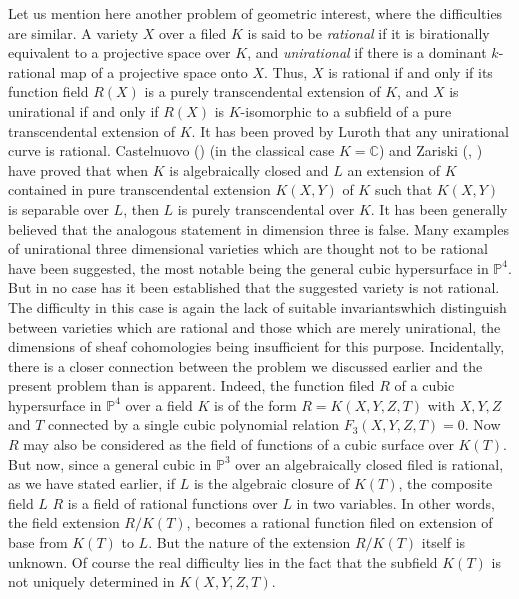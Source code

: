 Let us mention here another problem of geometric interest, where the
difficulties are similar. A variety $X$ over a filed $K$ is said to be
\textit{rational} if it is birationally equivalent to a projective space
over $K$, and \textit{unirational} if there is a dominant $k$-rational
map of a projective space onto $X$. Thus, $X$ is rational if and only
if its function field $R(X)$ is a purely transcendental extension of
$K$, and $X$ is unirational if and only if $R(X)$ is $K$-isomorphic to
a subfield of a pure transcendental extension of $K$. It has been
proved by Luroth that any unirational curve is rational. Castelnuovo
(\cite{key3}) (in the classical case $K = \mathbb{C}$) and Zariski
(\cite{key24}, \cite{key25}) have proved that when $K$ is algebraically closed and
$L$ an extension of $K$ contained in pure transcendental extension
$K(X,Y)$ of $K$ such that $K(X,Y)$ is separable over $L$, then $L$ is
purely transcendental over $K$. It has been generally believed that the
analogous statement  in dimension three is false. Many examples of
unirational three dimensional varieties which are thought not to be
rational have been suggested, the most notable being the general cubic
hypersurface in $\mathbb{P}^4$. But in no case has it been established
that the suggested variety is not rational. The difficulty in this
case is again the lack of suitable invariants\pageoriginale which distinguish
between varieties which are rational and those which are merely
unirational, the dimensions of sheaf cohomologies being insufficient
for this purpose. Incidentally, there is a closer connection between
the problem we discussed earlier and the present problem than is
apparent. Indeed, the function filed $R$ of a cubic hypersurface in
$\mathbb{P}^4$ over a field $K$ is of the form $R =K(X,Y,Z,T)$ with
$X,Y,Z$ and $T$ connected by a single cubic polynomial relation $F_3
(X,Y,Z,T)=0$. Now $R$ may also be considered as the field of
functions of a cubic surface over $K(T)$. But now, since a general
cubic in $\mathbb{P}^3$ over an algebraically closed filed is
rational, as we have stated earlier, if $L$ is the algebraic closure of
$K(T)$, the composite field $L$ $R$ is a field of rational functions
over $L$ in two variables. In other words, the field extension
$R/K(T)$, becomes a rational function filed on extension of base from
$K(T)$ to $L$. But the nature of the extension $R/K(T)$ itself is
unknown. Of course the real difficulty lies in the fact that the
subfield $K(T)$ is not uniquely determined in $K(X,Y,Z,T)$. 
